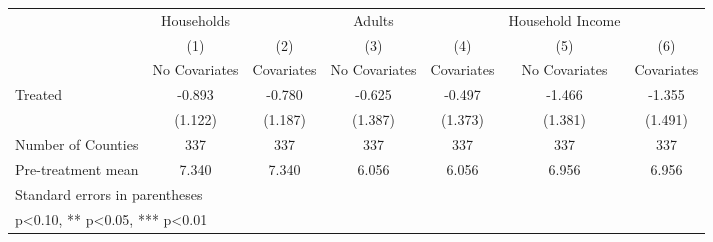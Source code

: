 {
\def\sym#1{\ifmmode^{#1}\else\(^{#1}\)\fi}
\begin{tabular}{l*{6}{c}}
\hline\hline
            &  Households   &               &      Adults   &               &Household Income   &               \\
            &\multicolumn{1}{c}{(1)}&\multicolumn{1}{c}{(2)}&\multicolumn{1}{c}{(3)}&\multicolumn{1}{c}{(4)}&\multicolumn{1}{c}{(5)}&\multicolumn{1}{c}{(6)}\\
            &\multicolumn{1}{c}{No Covariates}&\multicolumn{1}{c}{Covariates}&\multicolumn{1}{c}{No Covariates}&\multicolumn{1}{c}{Covariates}&\multicolumn{1}{c}{No Covariates}&\multicolumn{1}{c}{Covariates}\\
\hline
Treated     &      -0.893   &      -0.780   &      -0.625   &      -0.497   &      -1.466   &      -1.355   \\
            &     (1.122)   &     (1.187)   &     (1.387)   &     (1.373)   &     (1.381)   &     (1.491)   \\
\hline
Number of Counties&         337   &         337   &         337   &         337   &         337   &         337   \\
Pre-treatment mean&       7.340   &       7.340   &       6.056   &       6.056   &       6.956   &       6.956   \\
\hline\hline
\multicolumn{7}{l}{\footnotesize Standard errors in parentheses}\\
\multicolumn{7}{l}{\footnotesize * p<0.10, ** p<0.05, *** p<0.01}\\
\end{tabular}
}
